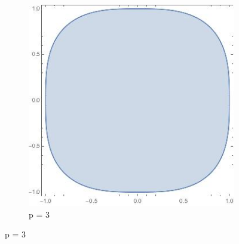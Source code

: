 \documentclass[12pt,letterpaper,reqno]{amsart}
\begin{document}
\begin{enumerate}[1.]
\begin{enumerate}[(a)]
\begin{figure}[h]
\begin{subfigure}{.33\textwidth}
  \includegraphics[width=.8\linewidth]{./norm-3.jpeg}
  \caption*{p = 3}
\end{subfigure}
\end{figure}


\end{enumerate}
\end{enumerate}
\end{document}
